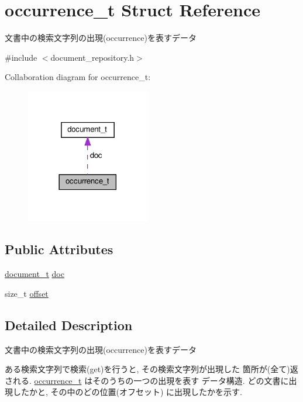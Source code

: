 \hypertarget{structoccurrence__t}{}\section{occurrence\+\_\+t Struct Reference}
\label{structoccurrence__t}


文書中の検索文字列の出現(occurrence)を表すデータ  




{\ttfamily \#include $<$document\+\_\+repository.\+h$>$}



Collaboration diagram for occurrence\+\_\+t\+:\nopagebreak
\begin{figure}[H]
\begin{center}
\leavevmode
\includegraphics[width=153pt]{structoccurrence__t__coll__graph}
\end{center}
\end{figure}
\subsection*{Public Attributes}
\begin{DoxyCompactItemize}
\item 
\hyperlink{structdocument__t}{document\+\_\+t} \hyperlink{structoccurrence__t_afcff1f11f483a42c75b8a4220f395842}{doc}
\item 
size\+\_\+t \hyperlink{structoccurrence__t_a647734d7e58f6dd1c266bd4824285528}{offset}
\end{DoxyCompactItemize}


\subsection{Detailed Description}
文書中の検索文字列の出現(occurrence)を表すデータ 

ある検索文字列で検索(get)を行うと, その検索文字列が出現した 箇所が(全て)返される. \hyperlink{structoccurrence__t}{occurrence\+\_\+t} はそのうちの一つの出現を表す データ構造. どの文書に出現したかと, その中のどの位置(オフセット) に出現したかを示す. 

